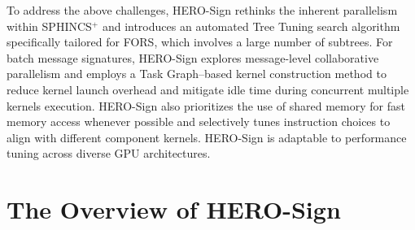 \documentclass[10pt,conference]{IEEEtran}
\begin{document}
To address the above challenges, HERO-Sign rethinks the inherent parallelism within SPHINCS$^+$ and introduces an automated Tree Tuning search algorithm specifically tailored for FORS, which involves a large number of subtrees. For batch message signatures, HERO-Sign explores message-level collaborative parallelism and employs a Task Graph–based kernel construction method to reduce kernel launch overhead and mitigate idle time during concurrent multiple kernels execution. HERO-Sign also prioritizes the use of shared memory for fast memory access whenever possible and selectively tunes instruction choices to align with different component kernels. HERO-Sign is adaptable to performance tuning across diverse GPU architectures.








\section{The Overview of HERO-Sign}


\end{document}

